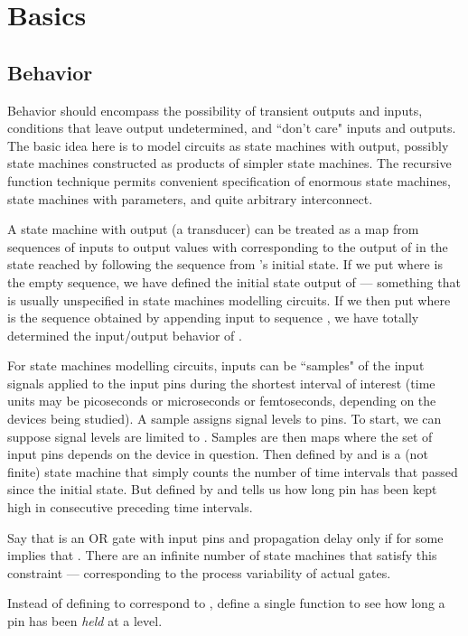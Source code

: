 \documentclass[runningheads,letter]{llncs}
\begin{document}
\section{Basics \label{sec:example1}}
\subsection{Behavior}
Behavior should encompass
the possibility of transient outputs and inputs, conditions that leave
output undetermined, and ``don't care" inputs and outputs.
The basic idea here is to model circuits as state
machines with output, possibly state machines constructed as products of
simpler state machines. The recursive function technique permits convenient specification of
enormous state machines, state machines with parameters, and quite arbitrary
interconnect. 

A state machine with output (a transducer)  can be treated as a map from sequences
of inputs to output values with  corresponding to the output of 
in the state reached by following the sequence  from 's initial state. If we put  where  is the empty sequence, we have defined
the initial state output of  --- something that is usually unspecified
in state machines modelling circuits. If we then put  where
 is the sequence obtained by appending input  to sequence , we have
totally determined the input/output behavior of .

For state machines
modelling circuits, inputs can be ``samples" of the input signals applied to
the input pins during the shortest interval of interest (time units may be
picoseconds or microseconds or femtoseconds, depending on the devices being
studied). A sample assigns signal levels to pins. To
start, we can suppose signal levels are limited to . Samples are then
maps  where the set of input pins depends on the device
in question.  Then  defined by  and
 is a (not finite) state machine that simply counts the
number of time intervals that passed since the initial state. But 
defined by  and  tells us how
long pin  has been kept high in consecutive preceding time intervals.

 Say that
 is an OR gate with input pins  and propagation delay  only if 
 for some  implies that .  
There are an infinite number of state machines that satisfy this constraint --- corresponding
to the process variability of actual gates.

Instead of defining  to correspond to , define a single function to see
how long a pin has been \emph{held} at a level.
\end{document}
